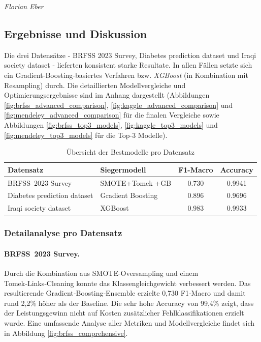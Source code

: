 \documentclass[10pt]{scrartcl}
\begin{document}
\begin{flushright}
  \footnotesize\textit{Florian Eber}
\end{flushright}






\subsection{Ergebnisse und Diskussion}
\label{sec:results_discussion}

Die drei Datensätze - BRFSS 2023 Survey, Diabetes prediction dataset und Iraqi society dataset - lieferten konsistent starke Resultate. In allen Fällen setzte sich ein Gradient-Boosting-basiertes Verfahren bzw. \emph{XGBoost} (in Kombination mit Resampling) durch. Die detaillierten Modellvergleiche und Optimierungsergebnisse sind im Anhang dargestellt (Abbildungen \ref{fig:brfss_advanced_comparison}, \ref{fig:kaggle_advanced_comparison} und \ref{fig:mendeley_advanced_comparison} für die finalen Vergleiche sowie Abbildungen \ref{fig:brfss_top3_models}, \ref{fig:kaggle_top3_models} und \ref{fig:mendeley_top3_models} für die Top-3 Modelle).

\begin{table}[htbp]
  \centering
  \caption{Übersicht der Bestmodelle pro Datensatz}
  \label{tab:bestmodels}
  \begin{tabular}{l l S[table-format=1.3] S[table-format=1.4]}
    \toprule
    \textbf{Datensatz} & \textbf{Siegermodell} & {\textbf{F1-Macro}} & {\textbf{Accuracy}} \\
    \midrule
    BRFSS 2023 Survey & SMOTE+Tomek +\;GB & 0.730 & 0.9941 \\
    Diabetes prediction dataset     & Gradient Boosting  & 0.896 & 0.9696 \\
    Iraqi society dataset   & XGBoost           & 0.983 & 0.9933 \\
    \bottomrule
  \end{tabular}
\end{table}

\subsubsection{Detailanalyse pro Datensatz}

\paragraph{BRFSS 2023 Survey.}
Durch die Kombination aus SMOTE-Oversampling und einem Tomek‑Links‑Cleaning konnte das Klassengleichgewicht verbessert werden. Das resultierende Gradient‑Boosting‑Ensemble erzielte 0{,}730 F1‑Macro und damit rund 2,2\% höher als der Baseline. Die sehr hohe Accuracy von 99,4\% zeigt, dass der Leistungsgewinn nicht auf Kosten zusätzlicher Fehlklassifikationen erzielt wurde. Eine umfassende Analyse aller Metriken und Modellvergleiche findet sich in Abbildung \ref{fig:brfss_comprehensive}.
\end{document}

